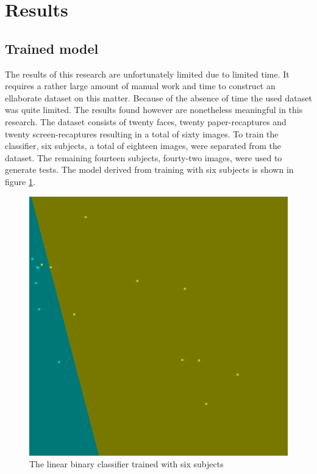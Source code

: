 \documentclass{sig-alternate-br}
\begin{document}
\section{Results} \label{results}

\subsection{Trained model} \label{model}
The results of this research are unfortunately limited due to limited time. It requires a rather large amount of manual work and time to construct an ellaborate dataset on this matter. Because of the absence of time the used dataset was quite limited. The results found however are nonetheless meaningful in this research. The dataset consists of twenty faces, twenty paper-recaptures and twenty screen-recaptures resulting in a total of sixty images. To train the classifier, six subjects, a total of eighteen images, were separated from the dataset. The remaining fourteen subjects, fourty-two images, were used to generate tests. The model derived from training with six subjects is shown in figure \ref{fig:model}.

\begin{figure}[h]
	\includegraphics[scale=0.2]{model}
	\caption{The linear binary classifier trained with six subjects}
	\label{fig:model}
\end{figure}
\end{document}
